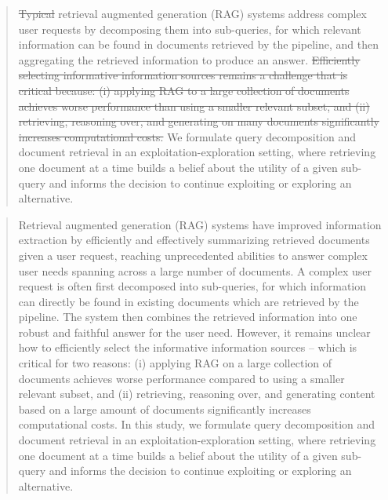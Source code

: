 \begin{abstract}
\st{Typical} retrieval augmented generation (RAG) systems address complex user requests by decomposing them into sub-queries, for which relevant information can be found in documents retrieved by the pipeline, and then aggregating the retrieved information to produce an answer. 
\st{Efficiently selecting informative information sources remains a challenge that is critical because: (i) applying RAG to a large collection of documents achieves worse performance than using a smaller relevant subset, and (ii) retrieving, reasoning over, and generating on many documents significantly increases computational costs.} 
We formulate query decomposition and document retrieval in an exploitation-exploration setting, where retrieving one document at a time builds a belief about the utility of a given sub-query and informs the decision to continue exploiting or exploring an alternative. 
\end{abstract}
\fi
\begin{abstract}
Retrieval augmented generation (RAG) systems have improved information extraction by efficiently and effectively summarizing retrieved documents given a user request, reaching unprecedented abilities to answer complex user needs spanning across a large number of documents. A complex user request is often first decomposed into sub-queries, for which information can directly be found in existing documents which are retrieved by the pipeline. The system then combines the retrieved information into one robust and faithful answer for the user need. However, it remains unclear how to efficiently select the informative information sources -- which is critical for two reasons: (i) applying RAG on a large collection of documents achieves worse performance compared to using a smaller relevant subset, and (ii) retrieving, reasoning over, and generating content based on a large amount of documents significantly increases computational costs. In this study, we formulate query decomposition and document retrieval in an exploitation-exploration setting, where retrieving one document at a time builds a belief about the utility of a given sub-query and informs the decision to continue exploiting or exploring an alternative.
\end{abstract}
\fi
